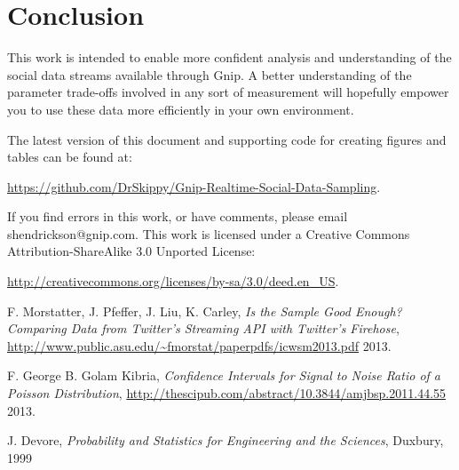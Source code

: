\documentclass{article}
\begin{document}
\section{Conclusion} 

This work is intended to enable more confident analysis and understanding of the social data 
streams available through Gnip. A better understanding of the parameter trade-offs involved 
in any sort of measurement will hopefully empower you to use these data more efficiently in 
your own environment.

The latest version of this document and supporting code for creating figures and tables 
can be found at:

\noindent \url{https://github.com/DrSkippy/Gnip-Realtime-Social-Data-Sampling}.

If you find errors in this work, or have comments, please email shendrickson@gnip.com. This 
work is licensed under a Creative Commons Attribution-ShareAlike 3.0 Unported License:

\noindent \url{http://creativecommons.org/licenses/by-sa/3.0/deed.en_US}.


\begin{thebibliography}{2013}



 F. Morstatter, J. Pfeffer, J. Liu, K. Carley, \textsl{Is the Sample Good Enough? Comparing Data from Twitter’s Streaming API with Twitter’s Firehose}, \url{http://www.public.asu.edu/~fmorstat/paperpdfs/icwsm2013.pdf} 2013.

 F. George B. Golam Kibria, \textsl{Confidence Intervals for Signal to Noise Ratio of
a Poisson Distribution}, \url{http://thescipub.com/abstract/10.3844/amjbsp.2011.44.55} 2013.

 J. Devore, \textsl{Probability and Statistics for Engineering and the Sciences}, Duxbury, 1999

\end{thebibliography}

\end{document}
